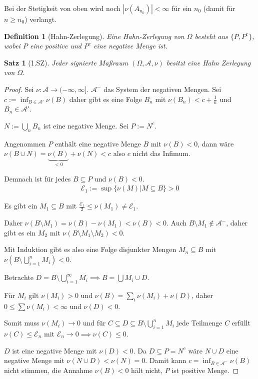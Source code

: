 \documentclass[]{article}
\newtheorem{theorem}{Satz}
\newtheorem{definition}{Definition}
\begin{document}
Bei der Stetigkeit von oben wird noch $|\nu(A_{n_0})| < \infty$ für ein $n_0$ (damit für $n\geq n_0$) verlangt.

\begin{definition}[Hahn-Zerlegung]
	Eine Hahn-Zerlegung von $\Omega$ besteht aus $\{P,P^c\}$, wobei $P$ eine positive und $P^c$ eine negative Menge ist.
\end{definition}

\begin{theorem}[1.SZ]
	Jeder signierte Maßraum $(\Omega, \mathcal{A}, \nu)$ besitzt eine Hahn Zerlegung von $\Omega$.
\end{theorem}

\begin{proof}
	Sei $\nu: \mathcal{A}\rightarrow (-\infty, \infty]$. $\mathcal{A}^-$ das System der negativen Mengen. Sei $c:=\inf_{B\in\mathcal{A}'}\nu(B)$ daher gibt es eine Folge $B_n$ mit $\nu(B_n) < c + \frac{1}{n}$ und $B_n \in \mathcal{A}'$.
	
	$N:=\bigcup_n B_n$ ist eine negative Menge. Sei $P:=N^c$.
	
	Angenommen $P$ enthält eine negative Menge $B$ mit $\nu(B) < 0$, dann wäre $\nu(B\cup N) = \underbrace{\nu(B)}_{<0}+\nu(N) < c$ also $c$ nicht das Infimum.
	
	Demnach ist für jedes $B \subseteq P$ und $\nu(B) < 0$.
	\begin{align*}
		\mathcal{E}_1 := \sup\{\nu(M) | M \subseteq B\} > 0
	\end{align*}

	Es gibt ein $M_1 \subseteq B$ mit $\frac{\mathcal{E}_1}{2} \leq \nu(M_1) \neq \mathcal{E}_1$.
	
	Daher $\nu(B\setminus M_1) = \nu(B) - \nu(M_1) < \nu(B) < 0$. Auch $B\setminus M_1 \notin \mathcal{A}^-$, daher gibt es ein $M_2$ mit $\nu(B \setminus M_1 \setminus M_2) < 0$.
	
	Mit Induktion gibt es also eine Folge disjunkter Mengen $M_n \subseteq B$ mit $\nu(B\setminus \bigcup_{i=1}^{n}M_i) < 0$.
	
	Betrachte $D = B\setminus\bigcup_{i=1}^{\infty} M_i \implies B = \bigcup M_i \cup D$.
	
	Für $M_i$ gilt $\nu(M_i) > 0$ und $\nu(B) = \sum_i \nu(M_i) + \nu(D)$, daher $0 \leq \sum \nu(M_i) < \infty$ und $\nu(D) < 0$.
	
	Somit muss $\nu(M_i) \rightarrow 0$ und für $C \subseteq D \subseteq B \setminus \bigcup_{i=1}^{n} M_i$ jede Teilmenge $C$ erfüllt $\nu(C) \leq \mathcal{E}_n$ mit $\mathcal{E}_n \rightarrow 0 \implies \nu(C) \leq 0$.
	
	$D$ ist eine negative Menge mit $\nu(D) < 0$. Da $D \subseteq P = N^c$ wäre $N \cup D$ eine negative Menge mit $\nu(N \cup D) < \nu(N) = 0$. Damit kann $c = \inf_{B\in\mathcal{A}^-}\nu(B)$ nicht stimmen, die Annahme $\nu(B) < 0$ hält nicht, $P$ ist positive Menge.
\end{proof}
\end{document}
